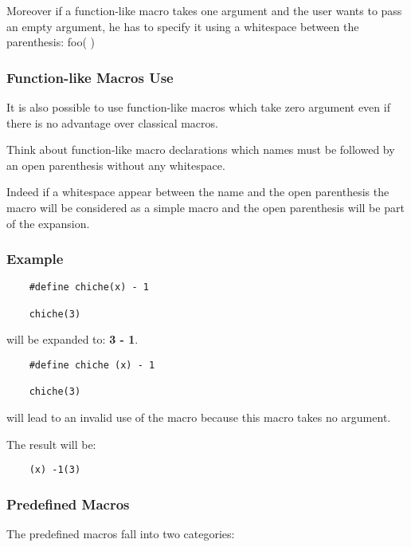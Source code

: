 {\begin{frame}[containsverbatim]
  \nl

  Moreover if a function-like macro takes one argument and the user
  wants to pass an empty argument, he has to specify it using a
  whitespace between the parenthesis: foo( )
\end{frame}


\begin{frame}
  \frametitle{Function-like Macros Use}

  It is also possible to use function-like macros which take zero argument
  even if there is no advantage over classical macros.

  \nl

  Think about function-like macro declarations which names \alert{must} be
  followed by an open parenthesis without any whitespace.

  \nl

  Indeed if a whitespace appear between the name and the open parenthesis
  the macro will be considered as a simple macro and the open parenthesis
  will be part of the expansion.
\end{frame}


\begin{frame}[containsverbatim]
  \frametitle{Example}

  \begin{verbatim}
    #define chiche(x) - 1

    chiche(3)
  \end{verbatim}

  will be expanded to: \textbf{3 - 1}.

  \begin{verbatim}
    #define chiche (x) - 1

    chiche(3)
  \end{verbatim}

  will lead to an invalid use of the macro because this macro takes no
  argument.

  \nl

  The result will be:

  \begin{verbatim}
    (x) -1(3)
  \end{verbatim}
\end{frame}


\begin{frame}
  \frametitle{Predefined Macros}

  The predefined macros fall into two categories:


\end{frame}}
